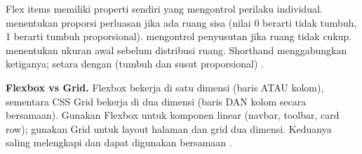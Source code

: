 Flex items memiliki properti sendiri yang mengontrol perilaku individual.  menentukan proporsi perluasan jika ada ruang sisa (nilai 0 berarti tidak tumbuh, 1 berarti tumbuh proporsional).  mengontrol penyusutan jika ruang tidak cukup.  menentukan ukuran awal sebelum distribusi ruang. Shorthand  menggabungkan ketiganya;  setara dengan  (tumbuh dan susut proporsional) \cite{webdevCss}.

\begin{catatan}
\textbf{Flexbox vs Grid.} Flexbox bekerja di satu dimensi (baris ATAU kolom), sementara CSS Grid bekerja di dua dimensi (baris DAN kolom secara bersamaan). Gunakan Flexbox untuk komponen linear (navbar, toolbar, card row); gunakan Grid untuk layout halaman dan grid dua dimensi. Keduanya saling melengkapi dan dapat digunakan bersamaan \cite{cssTricks}.
\end{catatan}

